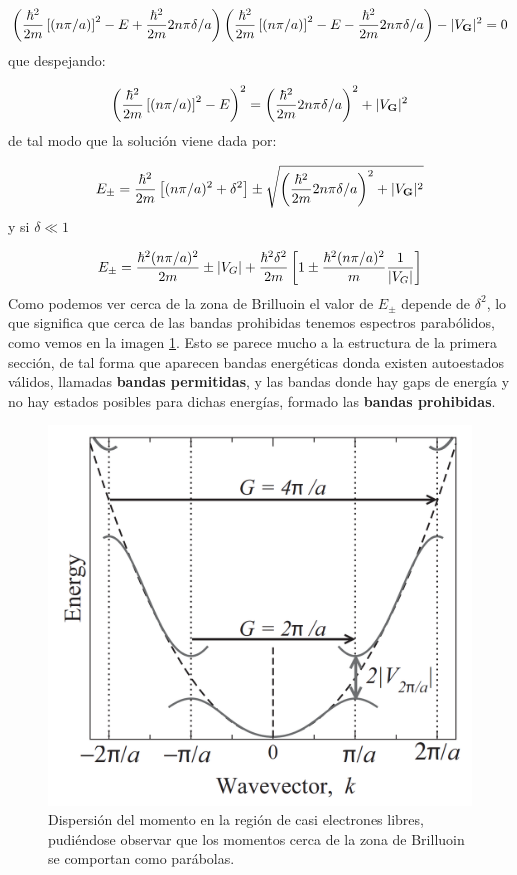 \begin{equation}
	\left( \frac{\hbar^2}{2m} \left[ (n\pi/a) \right]^2 - E + \frac{\hbar^2}{2m} 2 n \pi \delta / a  \right) \left( \frac{\hbar^2}{2m} \left[ (n\pi/a) \right]^2 - E - \frac{\hbar^2}{2m} 2 n \pi \delta / a  \right) - |V_{\mathbf{G}}|^2 = 0
\end{equation}
que despejando:

\begin{equation}
	\left( \frac{\hbar^2}{2m} \left[ (n\pi/a) \right]^2 - E  \right)^2 = \left(  \frac{\hbar^2}{2m} 2 n \pi \delta / a  \right)^2+|V_{\mathbf{G}}|^2 
\end{equation}
de tal modo que la solución viene dada por: 

\begin{equation}
	E_\pm = \frac{\hbar^2}{2m} \left[ (n\pi/a)^2+\delta^2 \right] \pm \sqrt{\left(  \frac{\hbar^2}{2m} 2 n \pi \delta / a  \right)^2+|V_{\mathbf{G}}|^2 }
\end{equation}
y si $\delta \ll 1$

\begin{equation}
	E_\pm = \frac{\hbar^2(n\pi/a)^2}{2m} \pm |V_G| + \frac{\hbar^2 \delta^2}{2m}\left[ 1\pm \frac{\hbar^2 (n\pi/a)^2}{m} \frac{1}{|V_G|} \right]
\end{equation}
Como podemos ver cerca de la zona de Brilluoin el valor de $E_\pm$ depende de $\delta^2$, lo  que significa que cerca de las bandas prohibidas tenemos espectros parabólidos, como vemos en la imagen \ref{Fig:07-02}. Esto se parece mucho a la estructura de la primera sección, de tal forma que aparecen bandas energéticas donda existen autoestados válidos, llamadas \textbf{bandas permitidas}, y las bandas donde hay gaps de energía y no hay estados posibles para dichas energías, formado las \textbf{bandas prohibidas}.

\begin{figure}[h!] \centering
	\includegraphics[scale=0.4]{Cuerpo/Ch_07/Oxford-02.png}
	\caption{Dispersión del momento en la región de casi electrones libres, pudiéndose observar que los momentos cerca de la zona de Brilluoin se comportan como parábolas.}
	\label{Fig:07-02}
\end{figure}    
	
